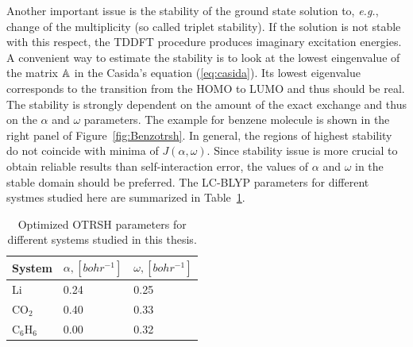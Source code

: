 Another important issue is the stability of the ground state solution to, \textit{e.g.}, change of the multiplicity (so called triplet stability). 
If the solution is not stable with this respect, the TDDFT procedure produces imaginary excitation energies.
A convenient way to estimate the stability is to look at the lowest eingenvalue of the 
matrix $\mathbb{A}$ in the Casida's equation (\ref{eq:casida}).
Its lowest eigenvalue corresponds to the transition from the HOMO to LUMO and thus should be real.
The stability is strongly dependent on the amount of the exact exchange and thus on the $\alpha$ and $\omega$ parameters.
The example for benzene molecule is shown in the right panel of Figure~\ref{fig:Benzotrsh}.
In general, the regions of highest stability do not coincide with minima of $J(\alpha,\omega)$.
Since stability issue is more crucial to obtain reliable results than self-interaction error, the values of $\alpha$ and $\omega$ in the stable domain should be preferred.
The LC-BLYP parameters for different systmes studied here are summarized in Table~\ref{tab:params}.

\begin{center}
\begin{table}[h]
\caption{Optimized OTRSH parameters for different systems studied in this thesis.}
\begin{tabular}{|l|l|l|}
\hline
System & $\alpha, [bohr^{-1}]$ & $\omega, [bohr^{-1}]$	\\
\hline
Li & 0.24 & 0.25 \\
\hline
CO$_2$ & 0.40 & 0.33 \\
\hline
C$_6$H$_6$ & 0.00 & 0.32 \\
\hline
\end{tabular}
\label{tab:params}
\end{table}
\end{center}

